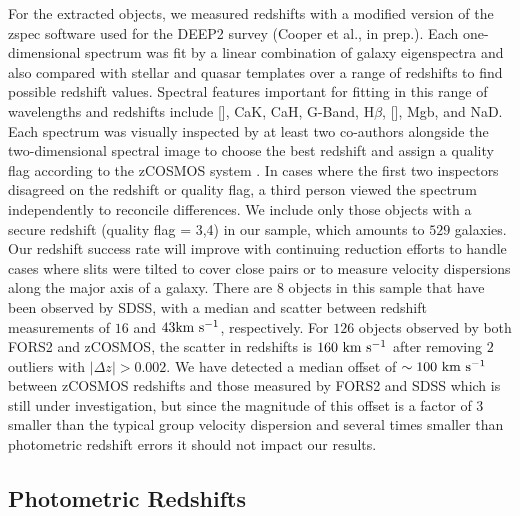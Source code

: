 For the extracted objects, we measured redshifts with a modified
version of the {\sc zspec} software used for the DEEP2 survey (Cooper
et al., in prep.). Each one-dimensional spectrum was fit by a linear
combination of galaxy eigenspectra and also compared with stellar and
quasar templates over a range of redshifts to find possible redshift
values. Spectral features important for fitting in this range of
wavelengths and redshifts include [], CaK, CaH, G-Band,
H$\beta$, [], Mgb, and NaD. Each spectrum was visually
inspected by at least two co-authors alongside the two-dimensional spectral image to choose the
best redshift and assign a quality flag according to the zCOSMOS
system \citep{Lilly2007}. In cases where the first two inspectors
disagreed on the redshift or quality flag, a third person viewed the
spectrum independently to reconcile differences. We
include only those objects with a secure redshift (quality flag = 3,4)
in our sample, which amounts to $529$ galaxies. Our redshift success
rate will improve with continuing reduction efforts to handle cases
where slits were tilted to cover close pairs or to measure
velocity dispersions along the major axis of a galaxy. There are $8$
objects in this sample that have been observed by SDSS, with a median
and scatter between redshift measurements of $16$ and $43
\rm{km~s^{-1}}$, respectively. For $126$ objects observed by both
FORS2 and zCOSMOS, the scatter in redshifts is $160~{\rm km~s^{-1}}$
after removing $2$ outliers with $|\Delta z|>0.002$. We have detected
a median offset of $\sim100~{\rm km~s^{-1}}$ between zCOSMOS redshifts
and those measured by FORS2 and SDSS which is still under
investigation, but since the magnitude of this offset is a factor of 3
smaller than the typical group velocity dispersion and several times
smaller than photometric redshift errors it should not impact our results.


\subsection{Photometric Redshifts}
\label{cat_s:photoz}

